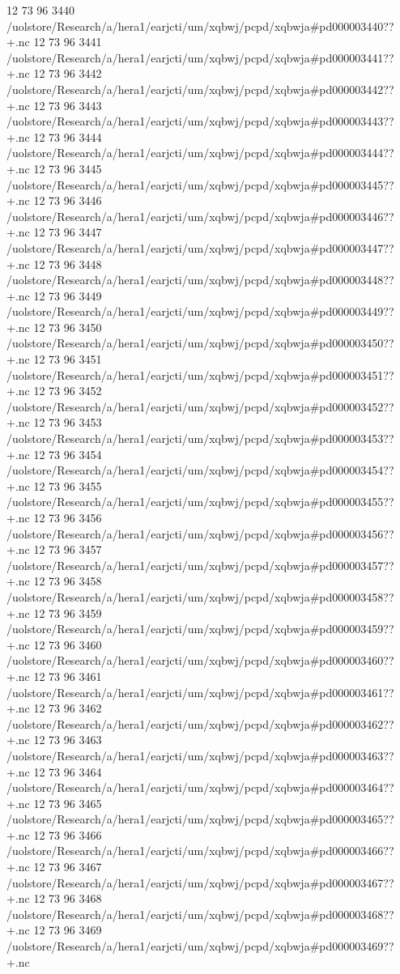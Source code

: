 12 73 96
3440
/uolstore/Research/a/hera1/earjcti/um/xqbwj/pcpd/xqbwja#pd000003440??+.nc
12 73 96
3441
/uolstore/Research/a/hera1/earjcti/um/xqbwj/pcpd/xqbwja#pd000003441??+.nc
12 73 96
3442
/uolstore/Research/a/hera1/earjcti/um/xqbwj/pcpd/xqbwja#pd000003442??+.nc
12 73 96
3443
/uolstore/Research/a/hera1/earjcti/um/xqbwj/pcpd/xqbwja#pd000003443??+.nc
12 73 96
3444
/uolstore/Research/a/hera1/earjcti/um/xqbwj/pcpd/xqbwja#pd000003444??+.nc
12 73 96
3445
/uolstore/Research/a/hera1/earjcti/um/xqbwj/pcpd/xqbwja#pd000003445??+.nc
12 73 96
3446
/uolstore/Research/a/hera1/earjcti/um/xqbwj/pcpd/xqbwja#pd000003446??+.nc
12 73 96
3447
/uolstore/Research/a/hera1/earjcti/um/xqbwj/pcpd/xqbwja#pd000003447??+.nc
12 73 96
3448
/uolstore/Research/a/hera1/earjcti/um/xqbwj/pcpd/xqbwja#pd000003448??+.nc
12 73 96
3449
/uolstore/Research/a/hera1/earjcti/um/xqbwj/pcpd/xqbwja#pd000003449??+.nc
12 73 96
3450
/uolstore/Research/a/hera1/earjcti/um/xqbwj/pcpd/xqbwja#pd000003450??+.nc
12 73 96
3451
/uolstore/Research/a/hera1/earjcti/um/xqbwj/pcpd/xqbwja#pd000003451??+.nc
12 73 96
3452
/uolstore/Research/a/hera1/earjcti/um/xqbwj/pcpd/xqbwja#pd000003452??+.nc
12 73 96
3453
/uolstore/Research/a/hera1/earjcti/um/xqbwj/pcpd/xqbwja#pd000003453??+.nc
12 73 96
3454
/uolstore/Research/a/hera1/earjcti/um/xqbwj/pcpd/xqbwja#pd000003454??+.nc
12 73 96
3455
/uolstore/Research/a/hera1/earjcti/um/xqbwj/pcpd/xqbwja#pd000003455??+.nc
12 73 96
3456
/uolstore/Research/a/hera1/earjcti/um/xqbwj/pcpd/xqbwja#pd000003456??+.nc
12 73 96
3457
/uolstore/Research/a/hera1/earjcti/um/xqbwj/pcpd/xqbwja#pd000003457??+.nc
12 73 96
3458
/uolstore/Research/a/hera1/earjcti/um/xqbwj/pcpd/xqbwja#pd000003458??+.nc
12 73 96
3459
/uolstore/Research/a/hera1/earjcti/um/xqbwj/pcpd/xqbwja#pd000003459??+.nc
12 73 96
3460
/uolstore/Research/a/hera1/earjcti/um/xqbwj/pcpd/xqbwja#pd000003460??+.nc
12 73 96
3461
/uolstore/Research/a/hera1/earjcti/um/xqbwj/pcpd/xqbwja#pd000003461??+.nc
12 73 96
3462
/uolstore/Research/a/hera1/earjcti/um/xqbwj/pcpd/xqbwja#pd000003462??+.nc
12 73 96
3463
/uolstore/Research/a/hera1/earjcti/um/xqbwj/pcpd/xqbwja#pd000003463??+.nc
12 73 96
3464
/uolstore/Research/a/hera1/earjcti/um/xqbwj/pcpd/xqbwja#pd000003464??+.nc
12 73 96
3465
/uolstore/Research/a/hera1/earjcti/um/xqbwj/pcpd/xqbwja#pd000003465??+.nc
12 73 96
3466
/uolstore/Research/a/hera1/earjcti/um/xqbwj/pcpd/xqbwja#pd000003466??+.nc
12 73 96
3467
/uolstore/Research/a/hera1/earjcti/um/xqbwj/pcpd/xqbwja#pd000003467??+.nc
12 73 96
3468
/uolstore/Research/a/hera1/earjcti/um/xqbwj/pcpd/xqbwja#pd000003468??+.nc
12 73 96
3469
/uolstore/Research/a/hera1/earjcti/um/xqbwj/pcpd/xqbwja#pd000003469??+.nc

